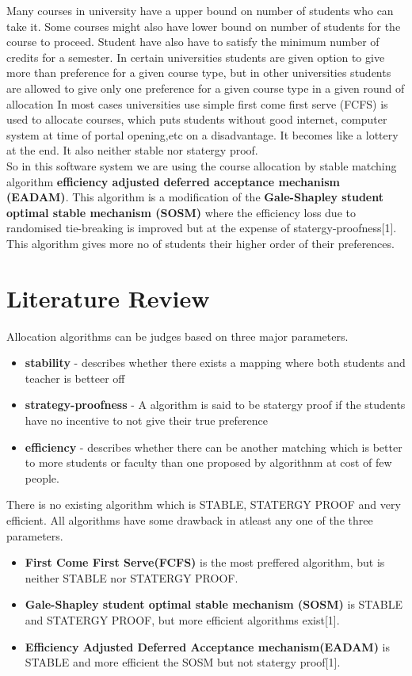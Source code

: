 \documentclass[conference]{IEEEtran}
\begin{document}
Many courses in university have a upper bound on number of students who can take it.
Some courses might also have lower bound on number of students for the course to proceed.
Student have also have to satisfy the minimum number of credits for a semester.
In certain universities students are given option to give more than preference for a given course type,
but in other universities students are allowed to give only one preference for a given course type in a given round of allocation
In most cases universities use simple first come first serve (FCFS) is used to allocate courses, 
which puts students without good internet, computer system at time of portal opening,etc on a disadvantage. 
It becomes like a lottery at the end. It also neither stable nor statergy proof.\\

So in this software system we are using the course allocation by stable matching algorithm \textbf{efficiency adjusted deferred acceptance mechanism (EADAM)}.
This algorithm is a modification of the  \textbf{Gale-Shapley student optimal stable mechanism (SOSM)} 
where the efficiency loss due to randomised tie-breaking is improved but at the expense of statergy-proofness[1].
This algorithm gives more no of students their higher order of their preferences.

\section{ \textbf{Literature Review} }

Allocation algorithms can be judges based on three major
parameters.
\begin{itemize}
\item \textbf{stability} - describes whether there exists a mapping where both students and teacher is betteer off
\item \textbf{strategy-proofness} - A algorithm is said to be statergy proof if the students
have no incentive to not give their true preference
\item \textbf{efficiency} - describes whether there can be another matching which is better to more students or faculty 
than one proposed by algorithnm at cost of few people. 
\end{itemize}
There is no existing algorithm which is STABLE, STATERGY PROOF and very efficient.
All algorithms have some drawback in atleast any one of the three parameters. 
\begin{itemize}
\item \textbf{First Come First Serve(FCFS)} is the most preffered algorithm, but is neither STABLE nor STATERGY PROOF. 
\item \textbf{Gale-Shapley student optimal stable mechanism (SOSM)} is STABLE and STATERGY PROOF, but more efficient algorithms exist[1].
\item \textbf{Efficiency Adjusted Deferred Acceptance mechanism(EADAM)} is STABLE and more efficient the SOSM but not statergy proof[1].
\end{itemize}
\end{document}
